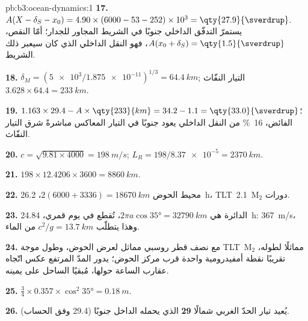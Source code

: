 \begin{solution}{pb:b3:ocean-dynamics:1}
\textbf{17.} $A(X - \delta_S - x_0) = 4.90\times(6000 - 53 - 252)\times
10^3 = \qty{27.9}{\sverdrup}$. يستمرّ التدفّق الداخلي جنوبًا في
الشريط المجاور للجدار؛ أمّا النقص، $A(x_0 + \delta_S) =
\qty{1.5}{\sverdrup}$، فهو النقل الداخلي الذي كان سيعبر
ذلك الشريط.

\textbf{18.} $\delta_M = (\num{5e3}/\num{1.875e-11})^{1/3} = \qty{64.4}{km}$;
التيار النفّاث $3.628\times64.4 = \qty{233}{km}$.

\textbf{19.} $1.163\times29.4 - A\times\qty{233}{km} = 34.2 - 1.1 =
\qty{33.0}{\sverdrup}$؛ الفائض، \qty{16}{\percent} من النقل الداخلي
يعود جنوبًا في التيار المعاكس مباشرةً شرق التيار النفّاث.

\textbf{20.} $c = \sqrt{9.81\times4000} = \qty{198}{m/s}$; $L_R =
198/\num{8.37e-5} = \qty{2370}{km}$.

\textbf{21.} $198\times12.4206\times3600 = \qty{8860}{km}$.

\textbf{22.} محيط الحوض $2(6000 + 3336) = \qty{18670}{km}$، \qty{26.2}{h}،
\mbox{\textdir TLT 2.1 M$_2$} دورات.

\textbf{23.} الدائرة هي $2\pi a\cos\ang{35} = \qty{32790}{km}$، تُقطع
في يوم قمري، \qty{24.84}{h}: \qty{367}{m/s}، وهذا يتطلّب $c^2/g =
\qty{13.7}{km}$ من الماء.

\textbf{24.} مع نصف قطر روسبي مماثل لعرض الحوض،
وطول موجة \mbox{\textdir TLT M$_2$} مماثلًا لطوله، تقريبًا نقطة أمفيدرومية واحدة
قرب مركز الحوض؛ يدور المدّ المرتفع عكس اتّجاه عقارب الساعة
حولها، مُبقيًا الساحل على يمينه.

\textbf{25.} $\tfrac34\times0.357\times\cos^2\ang{35} = \qty{0.18}{m}$.

\textbf{26.} يُعيد تيار الحدّ الغربي شمالًا
\textbf{\qty[text-series-to-math=true]{29}{\sverdrup}} الذي يحمله الداخل
جنوبًا (\qty{29.4}{\sverdrup} وفق الحساب).
\end{solution}
